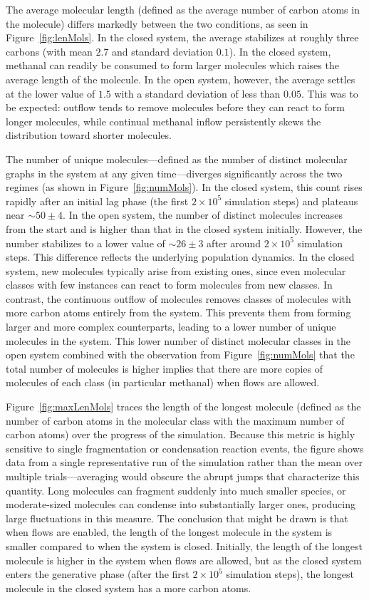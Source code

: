 The average molecular length (defined as the average number of carbon atoms in the molecule) differs markedly between the two conditions, as seen in Figure~\ref{fig:lenMols}. In the closed system, the average stabilizes at roughly three carbons (with mean $2.7$ and standard deviation $0.1$). In the closed system, methanal can readily be consumed to form larger molecules which raises the average length of the molecule. In the open system, however, the average settles at the lower value of $1.5$ with a standard deviation of less than $0.05$. This was to be expected: outflow tends to remove molecules before they can react to form longer molecules, while continual methanal inflow persistently skews the distribution toward shorter molecules.

The number of unique molecules—defined as the number of distinct molecular graphs in the system at any given time—diverges significantly across the two regimes (as shown in Figure~\ref{fig:numMols}). In the closed system, this count rises rapidly after an initial lag phase (the first $2\times 10^5$ simulation steps) and plateaus near $\sim 50\pm 4$. In the open system, the number of distinct molecules increases from the start and is higher than that in the closed system initially. However, the number stabilizes to a lower value of $\sim 26\pm 3$ after around $2\times 10^5$ simulation steps. This difference reflects the underlying population dynamics. In the closed system, new molecules typically arise from existing ones, since even molecular classes with few instances can react to form molecules from new classes. In contrast, the continuous outflow of molecules removes classes of molecules with more carbon atoms entirely from the system. This prevents them from forming larger and more complex counterparts, leading to a lower number of unique molecules in the system. This lower number of distinct molecular classes in the open system combined with the observation from Figure~\ref{fig:numMols} that the total number of molecules is higher implies that there are more copies of molecules of each class (in particular methanal) when flows are allowed.

Figure~\ref{fig:maxLenMols} traces the length of the longest molecule (defined as the number of carbon atoms in the molecular class with the maximum number of carbon atoms) over the progress of the simulation. Because this metric is highly sensitive to single fragmentation or condensation reaction events, the figure shows data from a single representative run of the simulation rather than the mean over multiple trials—averaging would obscure the abrupt jumps that characterize this quantity. Long molecules can fragment suddenly into much smaller species, or moderate-sized molecules can condense into substantially larger ones, producing large fluctuations in this measure. The conclusion that might be drawn is that when flows are enabled, the length of the longest molecule in the system is smaller compared to when the system is closed. Initially, the length of the longest molecule is higher in the system when flows are allowed, but as the closed system enters the generative phase (after the first $2\times 10^5$ simulation steps), the longest molecule in the closed system has a more carbon atoms.

